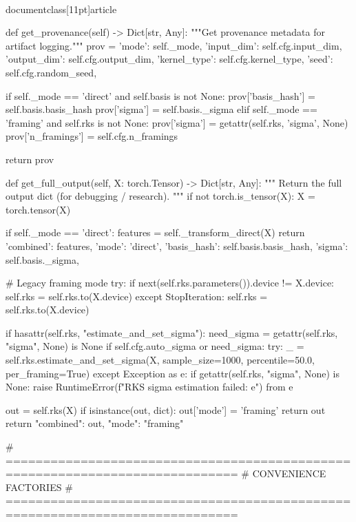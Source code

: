 \\documentclass[11pt]{article}
\begin{document}
\begin{CodeBlock}
    def get_provenance(self) -> Dict[str, Any]:
        """Get provenance metadata for artifact logging."""
        prov = {
            'mode': self._mode,
            'input_dim': self.cfg.input_dim,
            'output_dim': self.cfg.output_dim,
            'kernel_type': self.cfg.kernel_type,
            'seed': self.cfg.random_seed,
        }
        
        if self._mode == 'direct' and self.basis is not None:
            prov['basis_hash'] = self.basis.basis_hash
            prov['sigma'] = self.basis._sigma
        elif self._mode == 'framing' and self.rks is not None:
            prov['sigma'] = getattr(self.rks, 'sigma', None)
            prov['n_framings'] = self.cfg.n_framings
        
        return prov

    def get_full_output(self, X: torch.Tensor) -> Dict[str, Any]:
        """
        Return the full output dict (for debugging / research).
        """
        if not torch.is_tensor(X):
            X = torch.tensor(X)

        if self._mode == 'direct':
            features = self._transform_direct(X)
            return {
                'combined': features,
                'mode': 'direct',
                'basis_hash': self.basis.basis_hash,
                'sigma': self.basis._sigma,
            }

        # Legacy framing mode
        try:
            if next(self.rks.parameters()).device != X.device:
                self.rks = self.rks.to(X.device)
        except StopIteration:
            self.rks = self.rks.to(X.device)

        if hasattr(self.rks, "estimate_and_set_sigma"):
            need_sigma = getattr(self.rks, "sigma", None) is None
            if self.cfg.auto_sigma or need_sigma:
                try:
                    _ = self.rks.estimate_and_set_sigma(X, sample_size=1000, percentile=50.0, per_framing=True)
                except Exception as e:
                    if getattr(self.rks, "sigma", None) is None:
                        raise RuntimeError(f"RKS sigma estimation failed: {e}") from e

        out = self.rks(X)
        if isinstance(out, dict):
            out['mode'] = 'framing'
            return out
        return {"combined": out, "mode": "framing"}


# =============================================================================
# CONVENIENCE FACTORIES
# =============================================================================


\end{CodeBlock}
\end{document}
